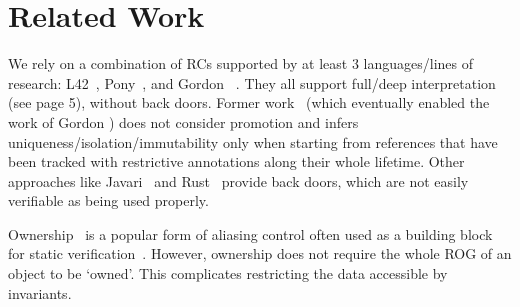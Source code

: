 \section[Related Work]{Related Work}
\label{s:related}
We rely on a combination of RCs supported by at least 3 languages/lines of research:
L42~\cite{ServettoZucca15,ServettoEtAl13a,JOT:issue_2011_01/article1,GianniniEtAl16},
Pony~\cite{clebsch2015deny,clebsch2017orca}, and Gordon \etal~\cite{GordonEtAl12}.
They all support full/deep interpretation (see page 5), without back doors.
Former work~\cite{Boyland10,boyland2003checking,Hogg91,Smith:2000:AT:645394.651903,DBLP:conf/pldi/AikenFKT03} (which eventually enabled the work of Gordon \etal)  does not consider promotion and 
infers uniqueness/isolation/immutability only when starting from references that have been tracked with restrictive annotations along their whole lifetime.
Other approaches like Javari~\cite{TschantzErnst05,Boyland06}
and Rust~\cite{matsakis2014rust}
provide back doors, which are not easily verifiable as being used properly.

Ownership~\cite{ClarkeEtAl13,ZibinEtAl10,DietlEtAl07} is a popular form of aliasing control often used as a building block for static verification~\cite{%
muller2002modular,%
barnett2011specification%
}.  However, ownership does not require the whole ROG of an object to be `owned'. This complicates restricting the data accessible by invariants.


